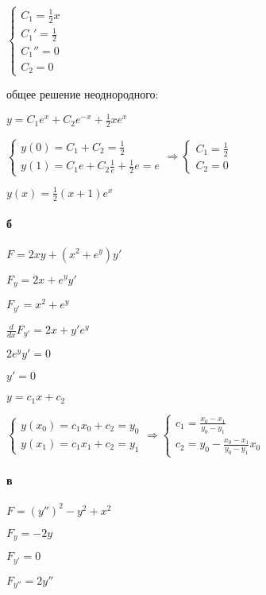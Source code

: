 \documentclass[russian]{article}
\begin{document}
$\begin{cases}
C_1 = \frac{1}{2}x \\
C_1' = \frac{1}{2} \\
C_1'' = 0 \\
C_2 = 0
\end{cases}$

общее решение неоднородного:

$y=C_1 e^x + C_2 e^{-x} + \frac{1}{2}x e^x$

$\begin{cases}
y(0) = C_1 + C_2 = \frac{1}{2} \\
y(1) = C_1 e + C_2 \frac{1}{e} + \frac{1}{2} e = e
\end{cases}
\Rightarrow 
\begin{cases}
C_1 = \frac{1}{2} \\
C_2 = 0
\end{cases}$

$y(x)=\frac{1}{2}(x+1)e^x$

\paragraph*{б}

$F = 2xy + (x^2 + e^y)y'$

$F_y = 2x + e^y y'$

$F_{y'} = x^2 + e^y$

$\frac{d}{dx}F_{y'} = 2x + y'e^y$

$2 e^y y' = 0$

$y' = 0$

$y= c_1 x + c_2 $

$\begin{cases}
y(x_0) = c_1 x_0 + c_2 = y_0 \\
y(x_1) = c_1 x_1 + c_2 = y_1
\end{cases}
\Rightarrow
\begin{cases}
c_1 = \frac{x_0 - x_1}{y_0 - y_1}\\
c_2 = y_0 - \frac{x_0 - x_1}{y_0 - y_1}  x_0
\end{cases}$

\paragraph*{в}

$F = (y'')^2 - y^2 + x^2 $

$F_y = -2y$

$F_{y'} = 0$

$F_{y''} = 2 y''$
\end{document}
